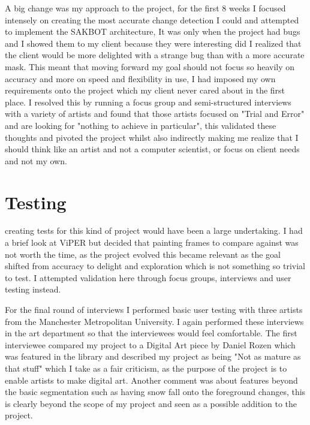 \documentclass[a4paper]{report}
\begin{document}
A big change was my approach to the project, for the first 8 weeks I focused intensely on creating the most accurate change detection I could and attempted to implement the SAKBOT architecture\cite{SAKBOT}, It was only when the project had bugs and I showed them to my client because they were interesting did I realized that the client would be more delighted with a strange bug than with a more accurate mask. This meant that moving forward my goal should not focus so heavily on accuracy and more on speed and flexibility in use, I had imposed my own requirements onto the project which my client never cared about in the first place. I resolved this by running a focus group and semi-structured interviews with a variety of artists and found that those artists focused on "Trial and Error" and are looking for "nothing to achieve in particular", this validated these thoughts and pivoted the project whilst also indirectly making me realize that I should think like an artist and not a computer scientist, or focus on client needs and not my own.

\section{Testing}
creating tests for this kind of project would have been a large undertaking. I had a brief look at ViPER\cite{VIPER} but decided that painting frames to compare against was not worth the time, as the project evolved this became relevant as the goal shifted from accuracy to delight and exploration which is not something so trivial to test. I attempted validation here through focus groups, interviews and user testing instead.

For the final round of interviews I performed basic user testing with three artists from the Manchester Metropolitan University. I again performed these interviews in the art department so that the interviewees would feel comfortable. The first interviewee compared my project to a Digital Art piece by Daniel Rozen which was featured in the library \cite{ROZEN} and described my project as being "Not as mature as that stuff" which I take as a fair criticism, as the purpose of the project is to enable artists to make digital art. Another comment was about features beyond the basic segmentation such as having snow fall onto the foreground changes, this is clearly beyond the scope of my project and seen as a possible addition to the project.
\end{document}
